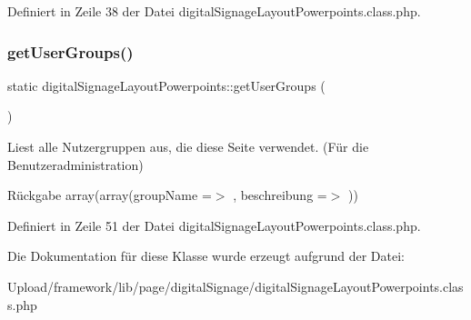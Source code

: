 Definiert in Zeile 38 der Datei digital\+Signage\+Layout\+Powerpoints.\+class.\+php.

\mbox{\label{classdigital_signage_layout_powerpoints_a992a47d5b7aa99ef722bb5dbbbee1673}} 
\subsubsection{\texorpdfstring{get\+User\+Groups()}{getUserGroups()}}
{\footnotesize\ttfamily static digital\+Signage\+Layout\+Powerpoints\+::get\+User\+Groups (\begin{DoxyParamCaption}{ }\end{DoxyParamCaption})\hspace{0.3cm}{\ttfamily [static]}}

Liest alle Nutzergruppen aus, die diese Seite verwendet. (Für die Benutzeradministration) \begin{DoxyReturn}{Rückgabe}
array(array(\textquotesingle{}group\+Name\textquotesingle{} =$>$ \textquotesingle{}\textquotesingle{}, \textquotesingle{}beschreibung\textquotesingle{} =$>$ \textquotesingle{}\textquotesingle{})) 
\end{DoxyReturn}


Definiert in Zeile 51 der Datei digital\+Signage\+Layout\+Powerpoints.\+class.\+php.



Die Dokumentation für diese Klasse wurde erzeugt aufgrund der Datei\+:\begin{DoxyCompactItemize}
\item 
Upload/framework/lib/page/digital\+Signage/digital\+Signage\+Layout\+Powerpoints.\+class.\+php\end{DoxyCompactItemize}
